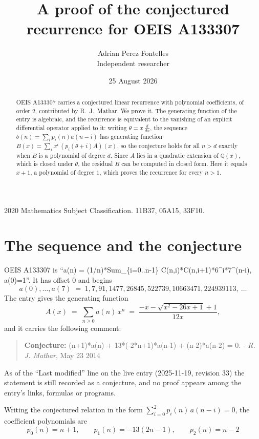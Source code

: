 \documentclass[11pt,a4paper]{article}
\title{A proof of the conjectured recurrence for OEIS A133307}
\author{Adrian Perez Fontelles\\ \small Independent researcher}
\date{25 August 2026}
\theoremstyle{plain}
\theoremstyle{definition}
\begin{document}
\maketitle

\begin{abstract}
OEIS A133307 carries a conjectured linear recurrence with polynomial coefficients, of
order 2, contributed by R.~J.~Mathar. We prove it. The generating function of the
entry is algebraic, and the recurrence is equivalent to the vanishing of an explicit
differential operator applied to it: writing $\theta=x\,\frac{d}{dx}$, the sequence
$b(n)=\sum_{i}p_{i}(n)a(n-i)$ has generating function
$B(x)=\sum_{i}x^{i}\,(p_{i}(\theta+i)A)(x)$, so the conjecture holds for all $n>d$ exactly
when $B$ is a polynomial of degree $d$. Since $A$ lies in a quadratic extension of
$\mathbb{Q}(x)$, which is closed under $\theta$, the residual $B$ can be computed in
closed form. Here it equals $x + 1$, a polynomial of degree $1$, which proves
the recurrence for every $n>1$.
\end{abstract}

\noindent\small 2020 Mathematics Subject Classification. 11B37, 05A15, 33F10.\normalsize

\section{The sequence and the conjecture}

OEIS A133307 is ``a(n) = (1/n)*Sum\_\{i=0..n-1\} C(n,i)*C(n,i+1)*6\^{}i*7\^{}(n-i), a(0)=1''. It has offset $0$ and begins
\[
a(0),\dots,a(7)\;=\;1, 7, 91, 1477, 26845, 522739, 10663471, 224939113,\ \dots
\]
The entry gives the generating function
\begin{equation}\label{eq:gf}
A(x)\;=\;\sum_{n\ge 0} a(n)\,x^{n}\;=\;\frac{- x - \sqrt{x^{2} - 26 x + 1} + 1}{12 x} ,
\end{equation}
and it carries the following comment:
\begin{quote}\small
\textbf{Conjecture:} (n+1)*a(n) + 13*(-2*n+1)*a(n-1) + (n-2)*a(n-2) = 0. - \emph{R. J. Mathar}, May 23 2014
\end{quote}
As of the ``Last modified'' line on the live entry (2025-11-19, revision 33) the
statement is still recorded as a conjecture, and no proof appears among the entry's links,
formulas or programs.

Writing the conjectured relation in the form $\sum_{i=0}^{2}p_{i}(n)\,a(n-i)=0$,
the coefficient polynomials are
\[
p_{0}(n)=n + 1,\qquad p_{1}(n)=- 13 \left(2 n - 1\right),\qquad p_{2}(n)=n - 2
\]
\end{document}
